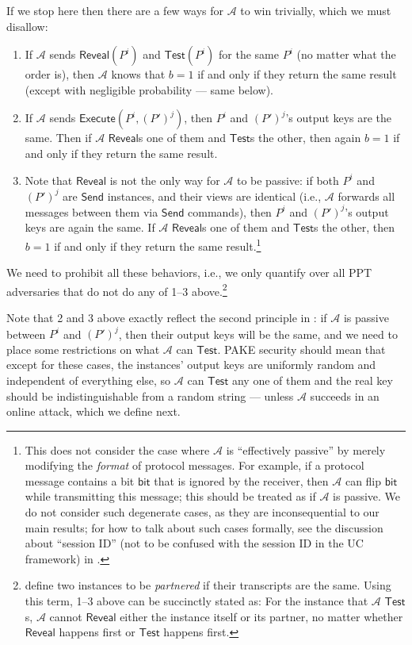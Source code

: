 \documentclass{article}
\newcommand{\adv}{\mathcal{A}}
\newcommand{\Execute}{\mathsf{Execute}}
\newcommand{\Send}{\mathsf{Send}}
\newcommand{\Reveal}{\mathsf{Reveal}}
\newcommand{\Test}{\mathsf{Test}}
\begin{document}
If we stop here then there are a few ways for $\adv$ to win trivially, which we must disallow:
\begin{enumerate}
  \item If $\adv$ sends $\Reveal(P^i)$ and $\Test(P^i)$ for the same $P^i$ (no matter what the order is), then $\adv$ knows that $b = 1$ if and only if they return the same result (except with negligible probability --- same below).
  \item If $\adv$ sends $\Execute(P^i, (P')^j)$, then $P^i$ and $(P')^j$'s output keys are the same. Then if $\adv$ $\Reveal$s one of them and $\Test$s the other, then again $b = 1$ if and only if they return the same result.
  \item Note that $\Reveal$ is not the only way for $\adv$ to be passive: if both $P^i$ and $(P')^j$ are $\Send$ instances, and their views are identical (i.e., $\adv$ forwards all messages between them via $\Send$ commands), then $P^i$ and $(P')^j$'s output keys are again the same. If $\adv$ $\Reveal$s one of them and $\Test$s the other, then $b = 1$ if and only if they return the same result.\footnote{This does not consider the case where $\adv$ is ``effectively passive'' by merely modifying the \emph{format} of protocol messages. For example, if a protocol message contains a bit $\mathsf{bit}$ that is ignored by the receiver, then $\adv$ can flip $\mathsf{bit}$ while transmitting this message; this should be treated as if $\adv$ is passive. We do not consider such degenerate cases, as they are inconsequential to our main results; for how to talk about such cases formally, see the discussion about ``session ID'' (not to be confused with the session ID in the UC framework) in \cite{EC:BelPoiRog00,JACM:KatOstYun09}.}
\end{enumerate}
We need to prohibit all these behaviors, i.e., we only quantify over all PPT adversaries that do not do any of 1--3 above.\footnote{\cite{EC:BelPoiRog00,JACM:KatOstYun09} define two instances to be \emph{partnered} if their transcripts are the same. Using this term, 1--3 above can be succinctly stated as: For the instance that $\adv$ $\Test$s, $\adv$ cannot $\Reveal$ either the instance itself or its partner, no matter whether $\Reveal$ happens first or $\Test$ happens first.}

Note that 2 and 3 above exactly reflect the second principle in : if $\adv$ is passive between $P^i$ and $(P')^j$, then their output keys will be the same, and we need to place some restrictions on what $\adv$ can $\Test$. PAKE security should mean that except for these cases, the instances' output keys are uniformly random and independent of everything else, so $\adv$ can $\Test$ any one of them and the real key should be indistinguishable from a random string --- unless $\adv$ succeeds in an online attack, which we define next.
\end{document}
